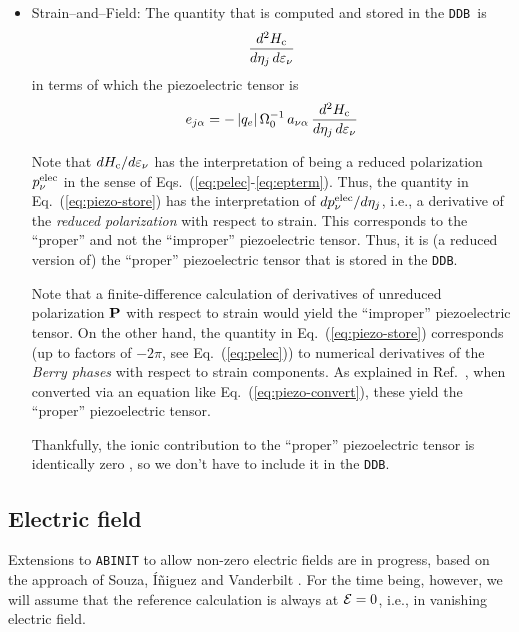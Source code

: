 \documentclass[11pt,fleqn]{article}
\def\beq{\begin{equation}}
\def\eeq{\end{equation}}
\def\E{{\cal E}}
\def\Oo{\Omega_0}
\def\bc{_{\rm c}}
\def\veps{\varepsilon}
\def\DDB{{\tt DDB}}
\begin{document}
\begin{itemize}
\item Strain--and--Field:
%
The quantity that is computed and stored in the \DDB\ is
%
\beq
{d^2H\bc \over d\eta_j\,d\veps_\nu}
\label{eq:piezo-store}
\eeq
%
in terms of which the piezoelectric tensor is
%
\beq
e_{j\alpha}=-\,|q_e|\,\Oo^{-1}\,a_{\nu\alpha}\,
{d^2H\bc \over d\eta_j\,d\veps_\nu}
\label{eq:piezo-convert}
\eeq
%

Note that $dH\bc/d\veps_\nu$ has the interpretation
of being a reduced polarization $p_\nu^{\rm elec}$ in the sense
of Eqs.~(\ref{eq:pelec}-\ref{eq:epterm}).  Thus, the quantity
in Eq.~(\ref{eq:piezo-store}) has the interpretation of
$dp_\nu^{\rm elec}/d\eta_j$, i.e., a derivative of the {\it reduced
polarization} with respect to strain.
This corresponds \cite{dv-piezo} to the ``proper'' and not
the ``improper'' piezoelectric tensor.  Thus, it is (a reduced
version of) the ``proper'' piezoelectric tensor that is stored
in the \DDB.

Note that a finite-difference calculation
of derivatives of unreduced polarization $\bf P$ with respect
to strain would yield the ``improper'' piezoelectric tensor.
On the other hand, the quantity in Eq.~(\ref{eq:piezo-store})
corresponds (up to factors of $-2\pi$, see Eq.~(\ref{eq:pelec}))
to numerical derivatives of the {\it Berry phases} with
respect to strain components.  As explained in Ref.~\cite{dv-piezo},
when converted via an equation like Eq.~(\ref{eq:piezo-convert}),
these yield the ``proper'' piezoelectric tensor.

Thankfully, the ionic contribution to the ``proper'' piezoelectric
tensor is identically zero \cite{dv-piezo}, so we don't have to
include it in the \DDB.


\end{itemize}

\subsection{Electric field}

Extensions to {\tt ABINIT} to allow non-zero electric fields are in
progress, based on the approach of Souza, \'I\~niguez and
Vanderbilt \cite{souza-ef}.  For the time being, however, we will
assume that the reference calculation is always at $\E=0$, i.e., in
vanishing electric field.
\end{document}
